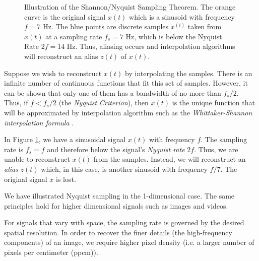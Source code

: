 \begin{figure}
\caption[Illustration of Nyquist Sampling]{Illustration of the Shannon/Nyquist Sampling Theorem. The orange curve is the original signal $x(t)$ which is a sinusoid with frequency $f = 7$ Hz. The blue points are discrete samples $x^{(i)}$ taken from $x(t)$ at a sampling rate $f_s = 7$ Hz, which is below the Nyquist Rate $2f = 14$ Hz. Thus, aliasing occurs and interpolation algorithms will reconstruct an alias $z(t)$ of $x(t)$.}
\label{fig:nyquist}
\end{figure}

Suppose we wish to reconstruct $x(t)$ by interpolating the samples.
There is an infinite number of continuous functions that fit this set of samples.
However, it can be shown that only one of them has a bandwidth of no more than $f_s/2$.
Thus, if $f < f_s/2$ (the \emph{Nyquist Criterion}), then $x(t)$ is the unique function that will be approximated by interpolation algorithm such as the \emph{Whittaker-Shannon interpolation formula} \cite{shannon1949}.

In Figure \ref{fig:nyquist}, we have a sinusoidal signal $x(t)$ with frequency $f$.
The sampling rate is $f_s=f$ and therefore below the signal's \emph{Nyquist rate} $2f$. 
Thus, we are unable to reconstruct $x(t)$ from the samples. 
Instead, we will reconstruct an \emph{alias} $z(t)$ which, in this case, is another sinusoid with frequency $f/7$.
The original signal $x$ is lost.

We have illustrated Nyquist sampling in the 1-dimensional case.
The same principles hold for higher dimensional signals such as images and videos.

For signals that vary with space, the sampling rate is governed by the desired spatial resolution.
In order to recover the finer details (the high-frequency components) of an image, we require higher pixel density (i.e. a larger number of pixels per centimeter (ppcm)).

